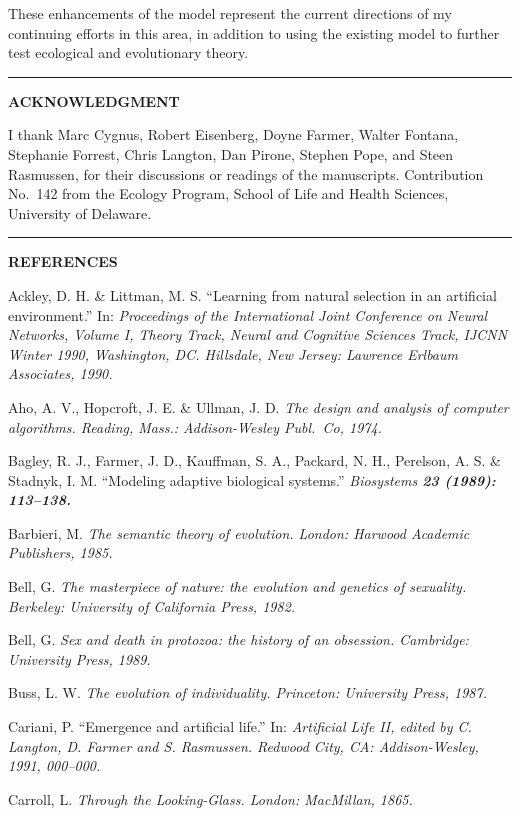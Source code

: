 These enhancements of the model represent the current directions of my
continuing efforts in this area, in addition to using the existing
model to further test ecological and evolutionary theory.

\LP
\rule[6pt]{6.5in}{1pt}
\large \bf ACKNOWLEDGMENT\rm \normalsize
\eLP

I thank Marc Cygnus, Robert Eisenberg, Doyne Farmer, Walter Fontana,
Stephanie Forrest, Chris Langton, Dan Pirone, Stephen Pope, and Steen
Rasmussen, for their discussions or readings of the manuscripts.
Contribution No.\ 142 from the Ecology Program, School of Life and Health
Sciences, University of Delaware.

\newpage

\LP
\rule[6pt]{6.5in}{1pt}
\large \bf REFERENCES\rm \normalsize
\eLP

\XP

Ackley, D. H. \& Littman, M. S.  ``Learning from natural
selection in an artificial environment.''  In: \it Proceedings of the
International Joint Conference on Neural Networks, Volume I, Theory Track,
Neural and Cognitive Sciences Track\rm , IJCNN Winter 1990, Washington, DC.
Hillsdale, New Jersey: Lawrence Erlbaum Associates, 1990.

Aho, A. V., Hopcroft, J. E. \& Ullman, J. D.  \it The design and
analysis of computer algorithms\rm .  Reading, Mass.: Addison-Wesley Publ.\
Co, 1974.

Bagley, R. J., Farmer, J. D., Kauffman, S. A., Packard, N. H., Perelson, A. S.
\& Stadnyk, I. M.  ``Modeling adaptive biological systems.'' \it Biosystems
\bf 23 \rm (1989): 113--138.

Barbieri, M.  \it The semantic theory of evolution\rm .  London:
Harwood Academic Publishers, 1985.

Bell, G.  \it The masterpiece of nature: the evolution and genetics
of sexuality\rm .  Berkeley: University of California Press, 1982.

Bell, G.  \it Sex and death in protozoa: the history of an
obsession\rm .  Cambridge: University Press, 1989.

Buss, L. W.  \it The evolution of individuality\rm .  Princeton:
University Press, 1987.

Cariani, P.  ``Emergence and artificial life.''  In: \it Artificial
Life II\rm, edited by C. Langton, D. Farmer and S. Rasmussen.
Redwood City, CA: Addison-Wesley, 1991, 000--000.

Carroll, L.  \it Through the Looking-Glass\rm .  London: MacMillan, 1865.

